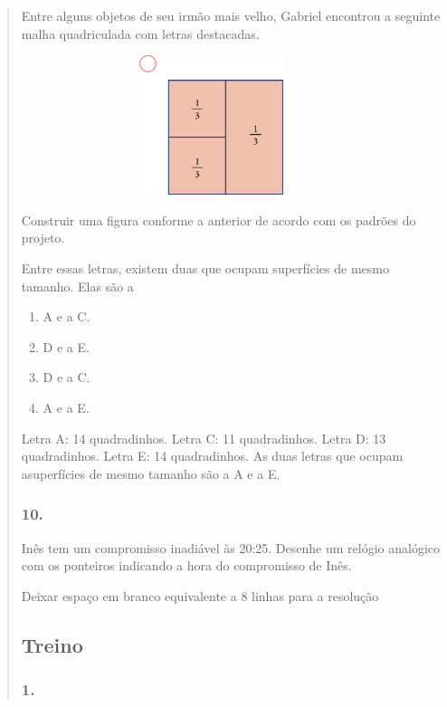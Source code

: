 \begin{enumerate}
\begin{escolha}
\begin{enumerate}
\begin{itemize}
\begin{itemize}
\begin{escolha}
\begin{quote}
Entre alguns objetos de seu irmão mais velho, Gabriel encontrou a seguinte
malha quadriculada com letras destacadas.

\includegraphics[width=4.36538in,height=1.60417in]{media/image69.png}

Construir uma figura conforme a anterior de acordo com os padrões do
projeto.

Entre essas letras, existem duas que ocupam superfícies de mesmo tamanho. Elas
são a

\begin{enumerate}
\def\labelenumi{\alph{enumi})}
\item
  A e a C.
\item
  D e a E.
\item
  D e a C.
\item
  A e a E.
\end{enumerate}

Letra A: 14 quadradinhos.
Letra C: 11 quadradinhos.
Letra D: 13 quadradinhos.
Letra E: 14 quadradinhos.
As duas letras que ocupam asuperfícies de mesmo tamanho são a A e a E.

\subsubsection{10.}\label{section-61}

Inês tem um compromisso inadiável às 20:25. Desenhe um relógio analógico
com os ponteiros indicando a hora do compromisso de Inês.

\Paulo Deixar espaço em branco equivalente a 8 linhas para a resolução



\subsection{Treino}\label{treino-4}

\subsubsection{1.}\label{section-62}


\end{quote}
\end{escolha}
\end{itemize}
\end{itemize}
\end{enumerate}
\end{escolha}
\end{enumerate}
